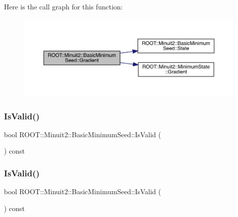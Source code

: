 Here is the call graph for this function\+:
\nopagebreak
\begin{figure}[H]
\begin{center}
\leavevmode
\includegraphics[width=350pt]{de/d50/classROOT_1_1Minuit2_1_1BasicMinimumSeed_ab61377b63a177c93629ccb3e69e173db_cgraph}
\end{center}
\end{figure}
\mbox{\label{classROOT_1_1Minuit2_1_1BasicMinimumSeed_ab53f2619d2b6be3d3d9303f8de29ab28}} 
\subsubsection{\texorpdfstring{IsValid()}{IsValid()}\hspace{0.1cm}{\footnotesize\ttfamily [1/3]}}
{\footnotesize\ttfamily bool R\+O\+O\+T\+::\+Minuit2\+::\+Basic\+Minimum\+Seed\+::\+Is\+Valid (\begin{DoxyParamCaption}{ }\end{DoxyParamCaption}) const\hspace{0.3cm}{\ttfamily [inline]}}

\mbox{\label{classROOT_1_1Minuit2_1_1BasicMinimumSeed_ab53f2619d2b6be3d3d9303f8de29ab28}} 
\subsubsection{\texorpdfstring{IsValid()}{IsValid()}\hspace{0.1cm}{\footnotesize\ttfamily [2/3]}}
{\footnotesize\ttfamily bool R\+O\+O\+T\+::\+Minuit2\+::\+Basic\+Minimum\+Seed\+::\+Is\+Valid (\begin{DoxyParamCaption}{ }\end{DoxyParamCaption}) const\hspace{0.3cm}{\ttfamily [inline]}}

